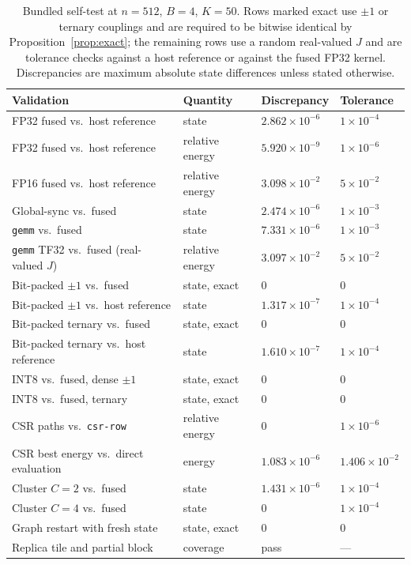 \documentclass[11pt,a4paper]{article}
\newcommand{\code}[1]{\texttt{#1}}
\begin{document}
\begin{table}[!ht]\centering\small
\caption{Bundled self-test at $n=512$, $B=4$, $K=50$. Rows marked exact use $\pm1$ or ternary couplings and are required to be bitwise identical by Proposition~\ref{prop:exact}; the remaining rows use a random real-valued $J$ and are tolerance checks against a host reference or against the fused FP32 kernel. Discrepancies are maximum absolute state differences unless stated otherwise.}
\label{tab:validation}
\begin{tabularx}{\linewidth}{Xlll}\toprule
Validation & Quantity & Discrepancy & Tolerance \\
\midrule
FP32 fused vs.\ host reference   & state        & $2.862\times10^{-6}$ & $1\times10^{-4}$ \\
FP32 fused vs.\ host reference   & relative energy & $5.920\times10^{-9}$ & $1\times10^{-6}$ \\
FP16 fused vs.\ host reference   & relative energy & $3.098\times10^{-2}$ & $5\times10^{-2}$ \\
Global-sync vs.\ fused           & state        & $2.474\times10^{-6}$ & $1\times10^{-3}$ \\
\code{gemm} vs.\ fused         & state        & $7.331\times10^{-6}$ & $1\times10^{-3}$ \\
\code{gemm} TF32 vs.\ fused (real-valued $J$) & relative energy & $3.097\times10^{-2}$ & $5\times10^{-2}$ \\
Bit-packed $\pm1$ vs.\ fused     & state, exact & $0$ & $0$ \\
Bit-packed $\pm1$ vs.\ host reference & state        & $1.317\times10^{-7}$ & $1\times10^{-4}$ \\
Bit-packed ternary vs.\ fused    & state, exact & $0$ & $0$ \\
Bit-packed ternary vs.\ host reference & state        & $1.610\times10^{-7}$ & $1\times10^{-4}$ \\
INT8 vs.\ fused, dense $\pm1$    & state, exact & $0$ & $0$ \\
INT8 vs.\ fused, ternary         & state, exact & $0$ & $0$ \\
CSR paths vs.\ \code{csr-row}  & relative energy & $0$ & $1\times10^{-6}$ \\
CSR best energy vs.\ direct evaluation & energy       & $1.083\times10^{-6}$ & $1.406\times10^{-2}$ \\
Cluster $C=2$ vs.\ fused         & state        & $1.431\times10^{-6}$ & $1\times10^{-4}$ \\
Cluster $C=4$ vs.\ fused         & state        & $0$ & $1\times10^{-4}$ \\
Graph restart with fresh state   & state, exact & $0$ & $0$ \\
Replica tile and partial block   & coverage     & pass & --- \\
\bottomrule
\end{tabularx}
\end{table}
\end{document}
